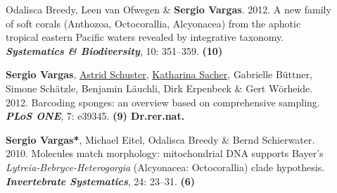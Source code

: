 \documentclass[letter,10pt]{article}
\begin{document}
\begin{description}
\item[]Odalisca Breedy, Leen van Ofwegen \& \textbf{Sergio Vargas}. 2012. A new family of soft corals (Anthozoa, Octocorallia, Alcyonacea) from the aphotic tropical eastern Pacific waters revealed by integrative taxonomy. \textbf{\emph{Systematics \& Biodiversity}}, 10: 351--359. \hfill\textbf{{\scriptsize (10)}}

\item[]\textbf{Sergio Vargas}, \underline{Astrid Schuster}, \underline{Katharina Sacher}, Gabrielle B\"uttner, Simone Sch\"atzle, Benjamin L\"auchli, Dirk Erpenbeck \& Gert W\"orheide. 2012. Barcoding sponges: an overview based on comprehensive sampling. \textbf{\emph{PLoS ONE}}, 7: e39345. \hfill\textbf{{\scriptsize (9) Dr.rer.nat.}}



\item[]\textbf{Sergio Vargas*}, Michael Eitel, Odalisca Breedy \& Bernd Schierwater. 2010. Molecules match morphology: mitochondrial DNA supports Bayer's \emph{Lytreia-Bebryce-Heterogorgia} (Alcyonacea: Octocorallia) clade hypothesis. \textbf{\emph{Invertebrate Systematics}}, 24: 23--31. \hfill\textbf{{\scriptsize (6)}}




\end{description}
\end{document}
